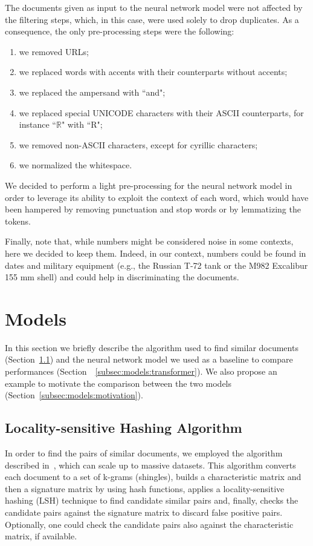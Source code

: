 \documentclass[runningheads]{llncs}
\begin{document}
The documents given as input to the neural network model were not affected by the filtering steps, which, in this case, were used solely to drop duplicates. As a consequence, the only pre-processing steps were the following:

\begin{enumerate}
  \item we removed URLs;
  \item we replaced words with accents with their counterparts without accents;
  \item we replaced the ampersand with “and";
  \item we replaced special UNICODE characters with their ASCII counterparts, for instance “$\mathbb{R}$" with “R";
  \item we removed non-ASCII characters, except for cyrillic characters;
  \item we normalized the whitespace.
\end{enumerate}

We decided to perform a light pre-processing for the neural network model in order to leverage its ability to exploit the context of each word, which would have been hampered by removing punctuation and stop words or by lemmatizing the tokens.

Finally, note that, while numbers might be considered noise in some contexts, here we decided to keep them. Indeed, in our context, numbers could be found in dates and military equipment (e.g., the Russian T-72 tank or the M982 Excalibur 155 mm shell) and could help in discriminating the documents.

\section{Models}
\label{sec:models}

In this section we briefly describe the algorithm used to find similar documents (Section~\ref{subsec:models:lsh}) and the neural network model we used as a baseline to compare performances (Section~~\ref{subsec:models:transformer}). We also propose an example to motivate the comparison between the two models (Section~\ref{subsec:models:motivation}).

\subsection{Locality-sensitive Hashing Algorithm}
\label{subsec:models:lsh}

In order to find the pairs of similar documents, we employed the algorithm described in~\cite{leskovec_2020}, which can scale up to massive datasets. This algorithm converts each document to a set of k-grams (shingles), builds a characteristic matrix and then a signature matrix by using hash functions, applies a locality-sensitive hashing (LSH) technique to find candidate similar pairs and, finally, checks the candidate pairs against the signature matrix to discard false positive pairs. Optionally, one could check the candidate pairs also against the characteristic matrix, if available.
\end{document}
